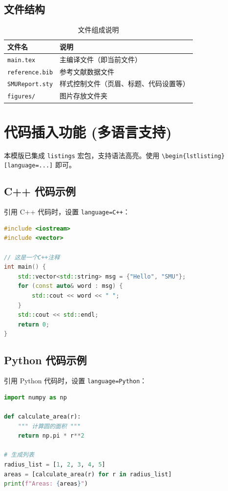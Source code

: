 \documentclass[12pt,hyperref,a4paper,UTF8,fontset=fandol]{ctexart}
\begin{document}
\subsection{文件结构}
\begin{table}[!htbp]
    \centering
    \begin{tabular}{l | l}
    \hline
        文件名 & 说明 \\
        \hline
        \texttt{main.tex}  & 主编译文件（即当前文件） \\
        \texttt{reference.bib} & 参考文献数据文件 \\
        \texttt{SMUReport.sty}  & 样式控制文件（页眉、标题、代码设置等）\\
        \texttt{figures/}  & 图片存放文件夹 \\
        \hline
    \end{tabular}
    \caption{文件组成说明}
\end{table}

\section{代码插入功能 (多语言支持)}
本模版已集成 \texttt{listings} 宏包，支持语法高亮。使用 \verb|\begin{lstlisting}[language=...]| 即可。

\subsection{C++ 代码示例}
引用 C++ 代码时，设置 \texttt{language=C++}：

\begin{lstlisting}[language=C++, caption={C++ Hello World 示例}, label={code:cpp}]
#include <iostream>
#include <vector>

// 这是一个C++注释
int main() {
    std::vector<std::string> msg = {"Hello", "SMU"};
    for (const auto& word : msg) {
        std::cout << word << " ";
    }
    std::cout << std::endl;
    return 0;
}
\end{lstlisting}

\subsection{Python 代码示例}
引用 Python 代码时，设置 \texttt{language=Python}：

\begin{lstlisting}[language=Python, caption={Python 列表推导式}, label={code:py}]
import numpy as np

def calculate_area(r):
    """ 计算圆的面积 """
    return np.pi * r**2

# 生成列表
radius_list = [1, 2, 3, 4, 5]
areas = [calculate_area(r) for r in radius_list]
print(f"Areas: {areas}")
\end{lstlisting}
\end{document}
